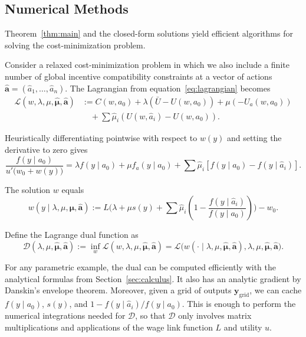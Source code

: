 \subsection{Numerical Methods}
\label{sec:numerical-methods}
Theorem~\ref{thm:main} and the closed-form solutions yield efficient algorithms for solving the cost-minimization problem.

Consider a relaxed cost-minimization problem in which we also include a finite number of global incentive compatibility constraints at a vector of actions $\boldsymbol{\hat a} = (\hat a_1, \ldots, \hat a_n)$. The Lagrangian from equation~\eqref{eq:lagrangian} becomes
\[
    \begin{aligned}
    \mathcal{L}(w,\lambda,\mu, \boldsymbol{\hat \mu}, \boldsymbol{\hat a})
    &:=
    C(w, a_0)
    +\lambda\left(\bar{U}-U(w, a_0)\right)
    +\mu(-U_{a}(w, a_0))\\
    &\quad+\sum \hat \mu_i \left(U(w, \hat a_i) - U(w, a_0)\right)
    \text{.}
    \end{aligned}
\]

Heuristically differentiating pointwise with respect to $w(y)$ and setting the derivative to zero gives
\[
    \frac{f(y \mid a_0)}{u'\bigl(w_0+w(y)\bigr)}
    =
    \lambda f(y \mid a_0)
    + \mu f_{a}(y\mid a_0)
    + \sum \hat \mu_i [f(y \mid a_0) - f(y \mid \hat a_i)]
    \text{.}
\]

The solution $w$ equals
\[
    w(y \mid \lambda, \mu, \boldsymbol{\hat \mu}, \boldsymbol{\hat a})
    :=
    L\biggl(
        \lambda + \mu s(y) + \sum \hat \mu_i \left(1 - \frac{f(y \mid \hat a_i)}{f(y \mid a_0)}\right)
    \biggr)-w_0
    \text{.}
\]

Define the Lagrange dual function as
\[
    \mathcal{D}(\lambda, \mu, \boldsymbol{\hat \mu}, \boldsymbol{\hat a})
    := \inf_{w}
    \mathcal{L}(w, \lambda, \mu, \boldsymbol{\hat \mu}, \boldsymbol{\hat a})
    =
    \mathcal{L}\bigl(w(\cdot \mid \lambda, \mu, \boldsymbol{\hat \mu}, \boldsymbol{\hat a}), \lambda, \mu, \boldsymbol{\hat \mu}, \boldsymbol{\hat a}\bigr)
    \text{.}
\]

For any parametric example, the dual can be computed efficiently with the analytical formulas from Section~\ref{sec:calculus}. It also has an analytic gradient by Danskin's envelope theorem. Moreover, given a grid of outputs $\mathbf{y}_{\mathrm{grid}}$, we can cache $f(y \mid a_0)$, $s(y)$, and $1 - {f(y \mid \hat a_i)}/{f(y \mid a_0)}$. This is enough to perform the numerical integrations needed for $\mathcal D$, so that $\mathcal D$ only involves matrix multiplications and applications of the wage link function $L$ and utility $u$.

